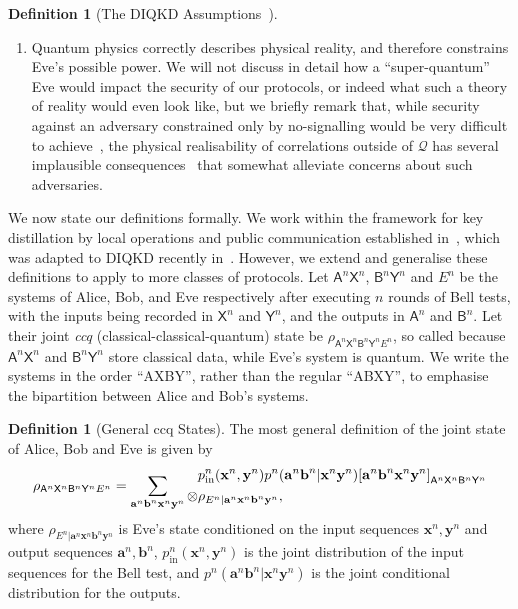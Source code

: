 \documentclass[10pt, a4paper]{article}
\numberwithin{equation}{section} %
\newcounter{stmt} %
\theoremstyle{definition}
\newtheorem{defn}[stmt]{Definition}
\theoremstyle{plain}
\newcommand{\restatableeq}[3]{\label{#3}#2\gdef#1{#2\tag{\ref{#3}}}} %
\newcommand{\?}{\mathrel{?}} %
\newcommand{\cvec}[1]{\boldsymbol{\mathbf{#1}}}    %
\newcommand{\crv}[1]{\mathsf{#1}}
\newcommand{\proj}[2][]{{[#2]}_{#1}}
\newcommand{\Qs}{\mathcal{Q}}
\newcommand{\prin}[1][p]{#1_{\mathrm{in}}}
\begin{document}
\begin{defn}[{The DIQKD Assumptions~\cite{DI_Proofs}}]
\begin{enumerate}
        \item Quantum physics correctly describes physical reality, and therefore constrains Eve's possible power. We will not discuss in detail how a ``super-quantum'' Eve would impact the security of our protocols, or indeed what such a theory of reality would even look like, but we briefly remark that, while security against an adversary constrained only by no-signalling would be very difficult to achieve~\cite{NSMemory, NSPAImpossible, ConsecutiveCKD}, the physical realisability of correlations outside of \(\Qs\) has several implausible consequences~\cite{ImplausibleConseq} that somewhat alleviate concerns about such adversaries.\label{assum:qcorrect}
      \end{enumerate}
    \end{defn}

    We now state our definitions formally. We work within the framework for key distillation by local operations and public communication established in~\cite{CQKeyDistill}, which was adapted to DIQKD recently in~\cite{DIQKD_Limits}. However, we extend and generalise these definitions to apply to more classes of protocols. Let \(\crv{A}^{n}\crv{X}^{n}\), \(\crv{B}^{n}\crv{Y}^{n}\) and \(E^n\) be the systems of Alice, Bob, and Eve respectively after executing \(n\) rounds of Bell tests, with the inputs being recorded in \(\crv{X}^{n}\) and \(\crv{Y}^{n}\), and the outputs in \(\crv{A}^{n}\) and \(\crv{B}^{n}\). Let their joint \emph{ccq} (classical-classical-quantum) state be \(\rho_{\crv{A}^n\crv{X}^n \crv{B}^n\crv{Y}^n E^n}\), so called because \(\crv{A}^n\crv{X}^n\) and \(\crv{B}^n\crv{Y}^n\) store classical data, while Eve's system is quantum. We write the systems in the order ``AXBY'', rather than the regular ``ABXY'', to emphasise the bipartition between Alice and Bob's systems.

    \begin{defn}[General ccq States]\label{def:ccq_belltest}
      The most general definition of the joint state of Alice, Bob and Eve is given by
      \begin{equation}
        \restatableeq{\bellccq}{
          \rho_{\crv{A}^n\crv{X}^n \crv{B}^n\crv{Y}^n E^n} = \sum_{\cvec{a}^n\cvec{b}^n \cvec{x}^n\cvec{y}^n} \begin{aligned}[c]
          & \prin^n(\cvec{x}^n,\cvec{y}^n) p^n(\cvec{a}^n\cvec{b}^n|\cvec{x}^n\cvec{y}^n) \proj[\crv{A}^n\crv{X}^n \crv{B}^n\crv{Y}^n]{\cvec{a}^n\cvec{b}^n\cvec{x}^n\cvec{y}^n} \\
            \otimes & \rho_{E^n|\cvec{a}^n\cvec{x}^n \cvec{b}^n\cvec{y}^n},
          \end{aligned}
        }{eqn:bellccq}
      \end{equation}
      where \(\rho_{E^n|\cvec{a}^n\cvec{x}^n \cvec{b}^n\cvec{y}^n}\) is Eve's state conditioned on the input sequences \(\cvec{x}^n, \cvec{y}^n\) and output sequences \(\cvec{a}^n, \cvec{b}^n\), \(\prin^n(\cvec{x}^n, \cvec{y}^n)\) is the joint distribution of the input sequences for the Bell test, and \(p^n(\cvec{a}^n \cvec{b}^n|\cvec{x}^n \cvec{y}^n)\) is the joint conditional distribution for the outputs.
    \end{defn}
\end{document}
